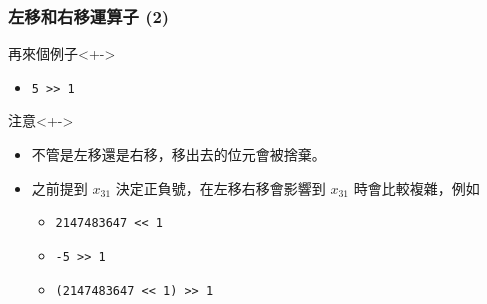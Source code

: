 \documentclass[utf8]{beamer}
\begin{document}
\begin{CJK}{UTF8}{bkai}
\begin{frame}[fragile]
  \frametitle{左移和右移運算子 (2)}
  \begin{exampleblock}{再來個例子}<+->
    \begin{itemize}
    \item \lstinline{5 >> 1}{}
    \end{itemize}
  \end{exampleblock}
  \begin{alertblock}{注意}<+->
    \begin{itemize}
    \item 不管是左移還是右移，移出去的位元會被捨棄。
    \item<+-> 之前提到 $x_{31}$ 決定正負號，在左移右移會影響到 $x_{31}$ 時會比較複雜，例如
      \begin{itemize}[<+->]
      \item \lstinline{2147483647 << 1}{}
      \item \lstinline{-5 >> 1}{}
      \item \lstinline{(2147483647 << 1) >> 1}{}
      \end{itemize}
    \end{itemize}
  \end{alertblock}
\end{frame}


\end{CJK}
\end{document}
